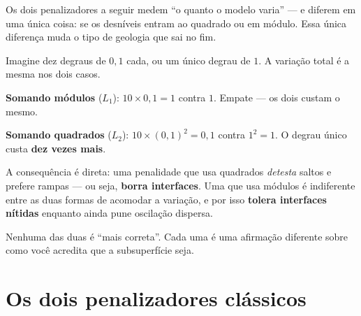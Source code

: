 \documentclass[11pt,a4paper,oneside]{report}
\begin{document}
\begin{matematica}
Os dois penalizadores a seguir medem ``o quanto o modelo varia'' --- e diferem
em uma \'unica coisa: se os desn\'iveis entram ao quadrado ou em m\'odulo.
Essa \'unica diferen\c{c}a muda o tipo de geologia que sai no fim.

Imagine dez degraus de $0{,}1$ cada, ou um \'unico degrau de $1$. A
varia\c{c}\~ao total \'e a mesma nos dois casos.

\textbf{Somando m\'odulos} ($L_1$): $10\times0{,}1 = 1$ contra $1$. Empate ---
os dois custam o mesmo.

\textbf{Somando quadrados} ($L_2$): $10\times(0{,}1)^{2} = 0{,}1$ contra
$1^{2} = 1$. O degrau \'unico custa \textbf{dez vezes mais}.

A consequ\^encia \'e direta: uma penalidade que usa quadrados \emph{detesta}
saltos e prefere rampas --- ou seja, \textbf{borra interfaces}. Uma que usa
m\'odulos \'e indiferente entre as duas formas de acomodar a varia\c{c}\~ao, e
por isso \textbf{tolera interfaces n\'itidas} enquanto ainda pune
oscila\c{c}\~ao dispersa.

Nenhuma das duas \'e ``mais correta''. Cada uma \'e uma afirma\c{c}\~ao
diferente sobre como voc\^e acredita que a subsuperf\'icie seja.
\end{matematica}

\section{Os dois penalizadores cl\'assicos}

\begin{center}
\end{center}
\end{document}
